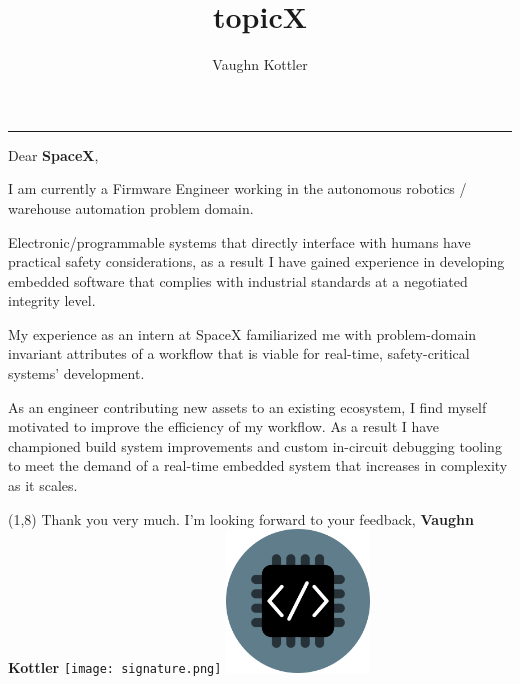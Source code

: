 \documentclass[letterpaper,12pt]{article}
\title{topicX}
\author{Vaughn Kottler}
\begin{document}
{\centering\noindent\rule{7.75in}{0.5pt}}\break\break
Dear {\color{pri-600}\textbf{SpaceX}},

\noindent\break
I am currently a Firmware Engineer working in the autonomous robotics /
warehouse automation problem domain.

\noindent\break
Electronic/programmable systems that directly interface with humans have
practical safety considerations, as a result I have gained experience in
developing embedded software that complies with industrial standards at
a negotiated integrity level.

\noindent\break
My experience as an intern at SpaceX familiarized me with problem-domain
invariant attributes of a workflow that is viable for real-time,
safety-critical systems' development.

\noindent\break
As an engineer contributing new assets to an existing ecosystem, I find myself
motivated to improve the efficiency of my workflow. As a result I have
championed build system improvements and custom in-circuit debugging tooling
to meet the demand of a real-time embedded system that increases in complexity
as it scales.

{\begin{textblock}{8}(1,8)\noindent
Thank you very much. I'm looking forward to your feedback,\break\break
{\color{pri-600}\textbf{Vaughn Kottler}}\break\break\break
\texttt{[image: signature.png]}
\hspace{1.75in}
\includegraphics[width=1.5in,natwidth=100,natheight=100]{../im/logo_circular_510.png}
\end{textblock}}
\end{document}
